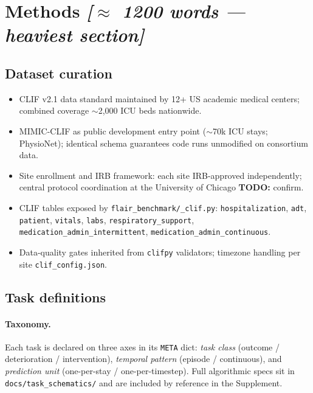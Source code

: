 \documentclass[11pt]{article}
\newcommand{\note}[1]{{\color{notecolor}\textit{[#1]}}}
\newcommand{\todo}[1]{{\color{red}\textbf{TODO:} #1}}
\begin{document}
\section{Methods \note{$\approx$ 1200 words --- heaviest section}}

\subsection*{Dataset curation}
\begin{itemize}[leftmargin=1.5em]
  \item CLIF v2.1 data standard maintained by 12+ US academic medical
        centers; combined coverage $\sim$2{,}000 ICU beds nationwide.
  \item MIMIC-CLIF as public development entry point ($\sim$70k ICU stays;
        PhysioNet); identical schema guarantees code runs unmodified on
        consortium data.
  \item Site enrollment and IRB framework: each site IRB-approved
        independently; central protocol coordination at the University
        of Chicago \todo{confirm}.
  \item CLIF tables exposed by \texttt{flair\_benchmark/\_clif.py}:
        \texttt{hospitalization}, \texttt{adt}, \texttt{patient},
        \texttt{vitals}, \texttt{labs}, \texttt{respiratory\_support},
        \texttt{medication\_admin\_intermittent},
        \texttt{medication\_admin\_continuous}.
  \item Data-quality gates inherited from \texttt{clifpy} validators;
        timezone handling per site \texttt{clif\_config.json}.
\end{itemize}

\subsection*{Task definitions}

\paragraph{Taxonomy.}
Each task is declared on three axes in its \texttt{META} dict:
\emph{task class} (outcome / deterioration / intervention),
\emph{temporal pattern} (episode / continuous), and
\emph{prediction unit} (one-per-stay / one-per-timestep).
Full algorithmic specs sit in \texttt{docs/task\_schematics/} and are
included by reference in the Supplement.
\end{document}
